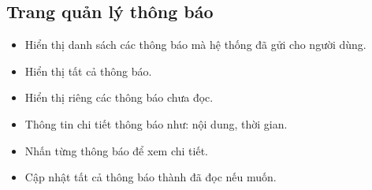 \subsection{Trang quản lý thông báo}
\begin{itemize}
    \item Hiển thị danh sách các thông báo mà hệ thống đã gửi cho người dùng.
    \item Hiển thị tất cả thông báo.
    \item Hiển thị riêng các thông báo chưa đọc.
    \item Thông tin chi tiết thông báo như: nội dung, thời gian.
    \item Nhấn từng thông báo để xem chi tiết.
    \item Cập nhật tất cả thông báo thành đã đọc nếu muốn.
\end{itemize}

